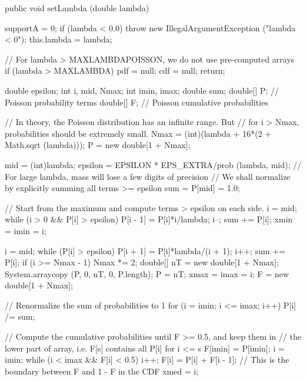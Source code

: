 \begin{code}

   public void setLambda (double lambda)\begin{hide} {
      supportA = 0;
      if (lambda < 0.0)
         throw new IllegalArgumentException ("lambda < 0");
      this.lambda = lambda;

      // For lambda > MAXLAMBDAPOISSON, we do not use pre-computed arrays
      if (lambda > MAXLAMBDA) {
         pdf = null;
         cdf = null;
         return;
      }

      double epsilon;
      int i, mid, Nmax;
      int imin, imax;
      double sum;
      double[] P;    // Poisson probability terms
      double[] F;    // Poisson cumulative probabilities

      // In theory, the Poisson distribution has an infinite range. But
      // for i > Nmax, probabilities should be extremely small.
      Nmax = (int)(lambda + 16*(2 + Math.sqrt (lambda)));
      P = new double[1 + Nmax];

      mid = (int)lambda;
      epsilon = EPSILON * EPS_EXTRA/prob (lambda, mid);
      // For large lambda, mass will lose a few digits of precision
      // We shall normalize by explicitly summing all terms >= epsilon
      sum = P[mid] = 1.0;

      // Start from the maximum and compute terms > epsilon on each side.
      i = mid;
      while (i > 0 && P[i] > epsilon) {
         P[i - 1] = P[i]*i/lambda;
         i--;
         sum += P[i];
      }
      xmin = imin = i;

      i = mid;
      while (P[i] > epsilon) {
         P[i + 1] = P[i]*lambda/(i + 1);
         i++;
         sum += P[i];
         if (i >= Nmax - 1) {
            Nmax *= 2;
            double[] nT = new double[1 + Nmax];
            System.arraycopy (P, 0, nT, 0, P.length);
            P = nT;
         }
      }
      xmax = imax = i;
      F = new double[1 + Nmax];

      // Renormalize the sum of probabilities to 1
      for (i = imin; i <= imax; i++)
         P[i] /= sum;

      // Compute the cumulative probabilities until F >= 0.5, and keep them in
      // the lower part of array, i.e. F[s] contains all P[i] for i <= s
      F[imin] = P[imin];
      i = imin;
      while (i < imax && F[i] < 0.5) {
         i++;
         F[i] = P[i] + F[i - 1];
      }
      // This is the boundary between F and 1 - F in the CDF
      xmed = i;

}
\end{hide}
\end{code}
